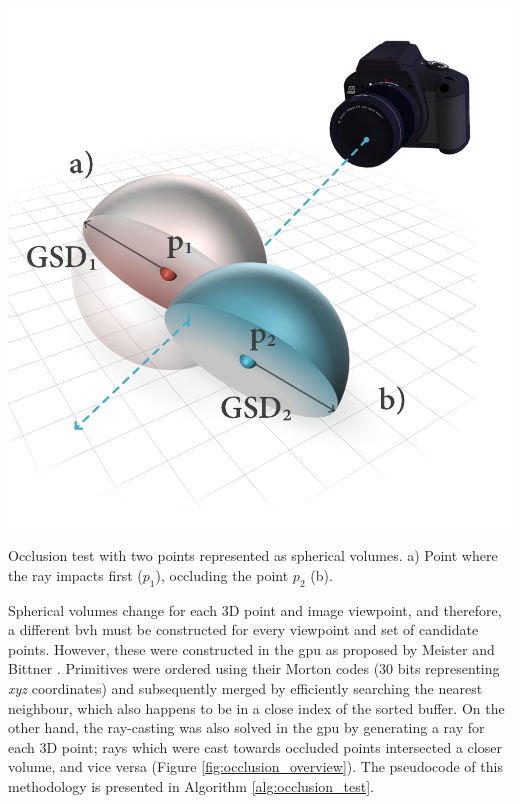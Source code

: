 \begin{marginfigure}[.0cm]
	\centering
	\includegraphics{figs/thermal_projection/occlusion_spheres.png}
	\caption{Occlusion test with two points represented as spherical volumes. a) Point where the ray impacts first ($p_1$), occluding the point $p_2$ (b).}
	\label{fig:occlusion_overview}
\end{marginfigure}
Spherical volumes change for each 3D point and image viewpoint, and therefore, a different \acrshort{bvh} must be constructed for every viewpoint and set of candidate points. However, these were constructed in the \acrshort{gpu} as proposed by Meister and Bittner \cite{meister_parallel_2018}. Primitives were ordered using their Morton codes (30 bits representing \textit{xyz} coordinates) and subsequently merged by efficiently searching the nearest neighbour, which also happens to be in a close index of the sorted buffer. On the other hand, the ray-casting was also solved in the \acrshort{gpu} by generating a ray for each 3D point; rays which were cast towards occluded points intersected a closer volume, and vice versa (Figure \ref{fig:occlusion_overview}). The pseudocode of this methodology is presented in Algorithm \ref{alg:occlusion_test}.

